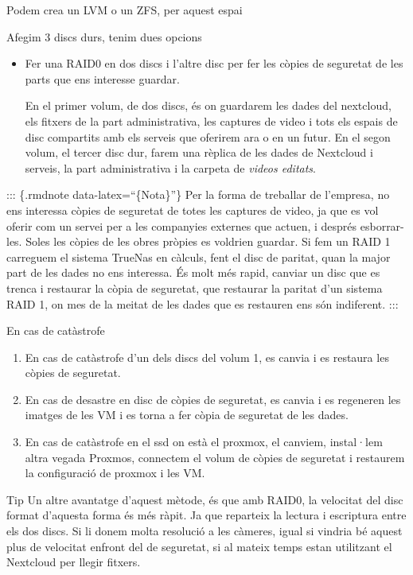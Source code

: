 \documentclass[
  10pt,
]{krantz}
\providecommand{\tightlist}{%
  \setlength{\itemsep}{0pt}\setlength{\parskip}{0pt}}
\begin{document}
Podem crea un LVM o un ZFS, per aquest espai

Afegim 3 discs durs, tenim dues opcions

\begin{itemize}
\item
  Fer una RAID0 en dos discs i l'altre disc per fer les còpies de seguretat de les parts que ens interesse guardar.

  En el primer volum, de dos discs, és on guardarem les dades del nextcloud, els fitxers de la part administrativa, les captures de video i tots els espais de disc compartits amb els serveis que oferirem ara o en un futur. En el segon volum, el tercer disc dur, farem una rèplica de les dades de Nextcloud i serveis, la part administrativa i la carpeta de \emph{videos editats}.
\end{itemize}

::: \{.rmdnote data-latex=``\{Nota\}''\} Per la forma de treballar de l'empresa, no ens interessa còpies de seguretat de totes les captures de video, ja que es vol oferir com un servei per a les companyies externes que actuen, i després esborrar-les. Soles les còpies de les obres pròpies es voldrien guardar. Si fem un RAID 1 carreguem el sistema TrueNas en càlculs, fent el disc de paritat, quan la major part de les dades no ens interessa. És molt més rapid, canviar un disc que es trenca i restaurar la còpia de seguretat, que restaurar la paritat d'un sistema RAID 1, on mes de la meitat de les dades que es restauren ens són indiferent. :::

En cas de catàstrofe

\begin{enumerate}
\def\labelenumi{\arabic{enumi}.}
\tightlist
\item
  En cas de catàstrofe d'un dels discs del volum 1, es canvia i es restaura les còpies de seguretat.
\item
  En cas de desastre en disc de còpies de seguretat, es canvia i es regeneren les imatges de les VM i es torna a fer còpia de seguretat de les dades.
\item
  En cas de catàstrofe en el ssd on està el proxmox, el canviem, instal·lem altra vegada Proxmos, connectem el volum de còpies de seguretat i restaurem la configuració de proxmox i les VM.
\end{enumerate}

\begin{rmdtip}{Tip}
Un altre avantatge d'aquest mètode, és que amb RAID0, la velocitat del disc format d'aquesta forma és més ràpit. Ja que reparteix la lectura i escriptura entre els dos discs. Si li donem molta resolució a les càmeres, igual si vindria bé aquest plus de velocitat enfront del de seguretat, si al mateix temps estan utilitzant el Nextcloud per llegir fitxers.

\end{rmdtip}
\end{document}
